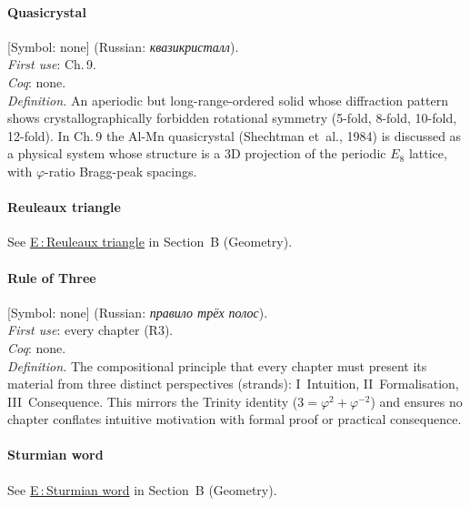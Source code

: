 \paragraph*{\textmd{\textbf{Quasicrystal}}}
\label{entry:quasicrystal}
[Symbol: none] (Russian: \textit{квазикристалл}).\\
\textit{First use}: Ch.\,9.\\
\textit{Coq}: none.\\
\textit{Definition.}
An aperiodic but long-range-ordered solid whose diffraction pattern
shows crystallographically forbidden rotational symmetry
(5-fold, 8-fold, 10-fold, 12-fold).
In Ch.\,9 the Al-Mn quasicrystal (Shechtman et~al., 1984) is discussed
as a physical system whose structure is a 3D projection of the
periodic $E_8$ lattice, with $\varphi$-ratio Bragg-peak spacings.

\paragraph*{\textmd{\textbf{Reuleaux triangle}}}
\quad See \hyperref[entry:reuleaux]{E\,:\,Reuleaux triangle} in
Section~B (Geometry).

\paragraph*{\textmd{\textbf{Rule of Three}}}
\label{entry:rule-of-three}
[Symbol: none] (Russian: \textit{правило трёх полос}).\\
\textit{First use}: every chapter (R3).\\
\textit{Coq}: none.\\
\textit{Definition.}
The compositional principle that every chapter must present its material
from three distinct perspectives (strands):
I~Intuition, II~Formalisation, III~Consequence.
This mirrors the Trinity identity ($3 = \varphi^2 + \varphi^{-2}$) and
ensures no chapter conflates intuitive motivation with formal proof
or practical consequence.

\paragraph*{\textmd{\textbf{Sturmian word}}}
\quad See \hyperref[entry:sturmian]{E\,:\,Sturmian word} in
Section~B (Geometry).

